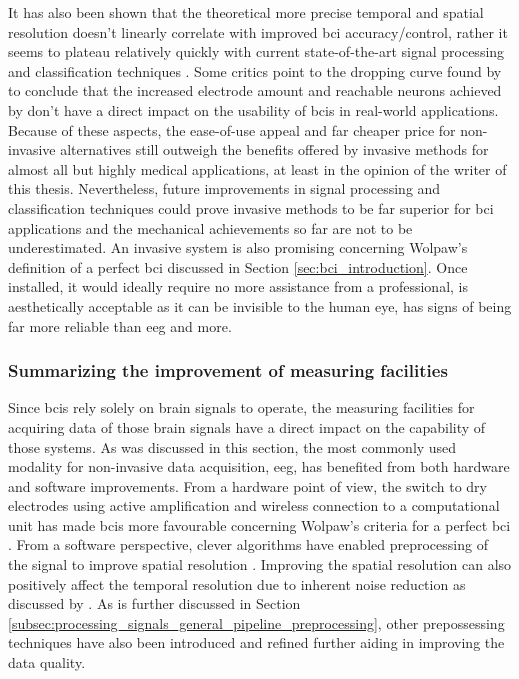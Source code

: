It has also been shown that the theoretical more precise temporal and spatial resolution doesn't linearly correlate with improved \gls{bci} accuracy/control, rather it seems to plateau relatively quickly with current state-of-the-art signal processing and classification techniques \citep{dropping_curve_eeg_lectrodes, more_electrodes_not_better}.
Some critics point to the dropping curve found by \citet{dropping_curve_eeg_lectrodes} to conclude that the increased electrode amount and reachable neurons achieved by \citet{neuralink_whitepaper} don't have a direct impact on the usability of \glspl{bci} in real-world applications.
Because of these aspects, the ease-of-use appeal and far cheaper price for non-invasive alternatives still outweigh the benefits offered by invasive methods for almost all but highly medical applications, at least in the opinion of the writer of this thesis.
Nevertheless, future improvements in signal processing and classification techniques could prove invasive methods to be far superior for \gls{bci} applications and the mechanical achievements so far are not to be underestimated.
An invasive system is also promising concerning Wolpaw's definition of a perfect \gls{bci} discussed in Section \ref{sec:bci_introduction}.
Once installed, it would ideally require no more assistance from a professional, is aesthetically acceptable as it can be invisible to the human eye, has signs of being far more reliable than \gls{eeg} and more.


\subsubsection{Summarizing the improvement of measuring facilities}
\label{subsubsec:bci_gaining_popularity_better_measuring_summary}

Since \glspl{bci} rely solely on brain signals to operate, the measuring facilities for acquiring data of those brain signals have a direct impact on the capability of those systems.
As was discussed in this section, the most commonly used modality for non-invasive data acquisition, \gls{eeg}, has benefited from both hardware and software improvements.
From a hardware point of view, the switch to dry electrodes using active amplification and wireless connection to a computational unit has made \glspl{bci} more favourable concerning Wolpaw's criteria for a perfect \gls{bci} \citep{bluetooth_evaluation, wet_vs_dry, active_electrode_explained}.
From a software perspective, clever algorithms have enabled preprocessing of the signal to improve spatial resolution \citep{improve_eeg_spatial_laplacian1, improve_eeg_spatial_laplacian2, improve_eeg_spatial_laplacian3, improve_eeg_spatial_cnn}.
Improving the spatial resolution can also positively affect the temporal resolution due to inherent noise reduction as discussed by \citet{improve_eeg_spatial_comparison}. 
As is further discussed in Section \ref{subsec:processing_signals_general_pipeline_preprocessing}, other prepossessing techniques have also been introduced and refined further aiding in improving the data quality. 

